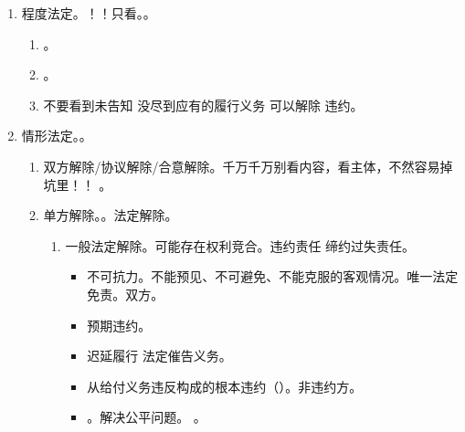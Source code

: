 \begin{enumerate}
\begin{enumerate}
                \begin{enumerate}
                  \item {}。
                  \item 拿无效的合同迷惑你。。
                \end{enumerate}
          \item 程度法定。！！只看。。
                \begin{enumerate}
                  \item {}。
                  \item {}。
                  \item 不要看到未告知 \yjt 没尽到应有的履行义务 \yjt 可以解除 \yjt 违约。
                \end{enumerate}
          \item 情形法定。。
                \begin{enumerate}
                  \item 双方解除/协议解除/合意解除。千万千万别看内容，看主体，不然容易掉坑里！！
                        。
                  \item 单方解除。\yi {}。\er 法定解除。
                        \begin{enumerate}
                          \item 一般法定解除。可能存在权利竞合。违约责任 \hz 缔约过失责任。
                                \begin{itemize}
                                  \item 不可抗力。不能预见、不可避免、不能克服的客观情况。唯一法定免责。双方。
                                  \item 预期违约。
                                  \item 迟延履行 \yjt 法定催告义务。
                                  \item 从给付义务违反构成的根本违约（）。\sjt 非违约方。
                                  \item {}。解决公平问题。 \yjt {}。

\end{itemize}
\end{enumerate}
\end{enumerate}
\end{enumerate}
\end{enumerate}
